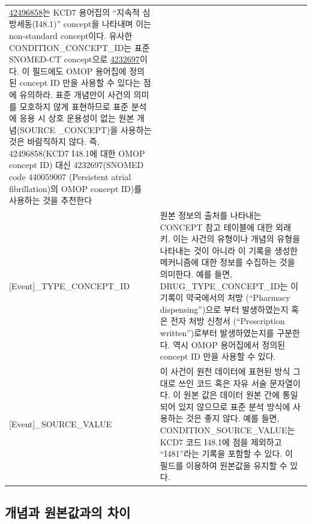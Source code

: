 \documentclass[10.5pt]{book}
\theoremstyle{definition}
\theoremstyle{definition}
\theoremstyle{definition}
\theoremstyle{remark}
\begin{document}
\begin{longtable}[]{@{}ll@{}}
\begin{minipage}[t]{0.60\columnwidth}
\href{http://athena.ohdsi.org/search-terms/terms/42488512}{42496858}는
KCD7 용어집의 ``지속적 심방세동(I48.1)'' concept을 나타내며 이는
non-standard concept이다. 유사한 CONDITION\_CONCEPT\_ID는 표준 SNOMED-CT
concept으로
\href{http://athena.ohdsi.org/search-terms/terms/4232697}{4232697}이다.
이 필드에도 OMOP 용어집에 정의된 concept ID 만을 사용할 수 있다는 점에
유의하라. 표준 개념만이 사건의 의미를 모호하지 않게 표현하므로 표준
분석에 응용 시 상호 운용성이 없는 원본 개념(SOURCE \_CONCEPT)을 사용하는
것은 바람직하지 않다. 즉, 42496858(KCD7 I48.1에 대한 OMOP concept ID)
대신 4232697(SNOMED code 440059007 (Persistent atrial fibrillation)의
OMOP concept ID)를 사용하는 것을 추천한다\strut
\end{minipage}\tabularnewline
\begin{minipage}[t]{0.34\columnwidth}\raggedright\strut
{[}Event{]}\_TYPE\_CONCEPT\_ID\strut
\end{minipage} & \begin{minipage}[t]{0.60\columnwidth}\raggedright\strut
원본 정보의 출처를 나타내는 CONCEPT 참고 테이블에 대한 외래 키. 이는
사건의 유형이나 개념의 유형을 나타내는 것이 아니라 이 기록을 생성한
메커니즘에 대한 정보를 수집하는 것을 의미한다. 예를 들면,
DRUG\_TYPE\_CONCEPT\_ID는 이 기록이 약국에서의 처방 (``Pharmacy
dispensing'')으로 부터 발생하였는지 혹은 전자 처방 신청서
(``Prescription written'')로부터 발생하였는지를 구분한다. 역시 OMOP
용어집에서 정의된 concept ID 만을 사용할 수 있다.\strut
\end{minipage}\tabularnewline
\begin{minipage}[t]{0.34\columnwidth}\raggedright\strut
{[}Event{]}\_SOURCE\_VALUE\strut
\end{minipage} & \begin{minipage}[t]{0.60\columnwidth}\raggedright\strut
이 사건이 원천 데이터에 표현된 방식 그대로 쓰인 코드 혹은 자유 서술
문자열이다. 이 원본 값은 데이터 원본 간에 통일되어 있지 않으므로 표준
분석 방식에 사용하는 것은 좋지 않다. 예를 들면,
CONDITION\_SOURCE\_VALUE는 KCD7 코드 I48.1에 점을 제외하고 ``I481''라는
기록을 포함할 수 있다. 이 필드를 이용하여 원본값을 유지할 수 있다.\strut
\end{minipage}\tabularnewline
\bottomrule
\end{longtable}

\subsection{개념과 원본값과의 차이}\label{concepts-Sources}
\end{document}
